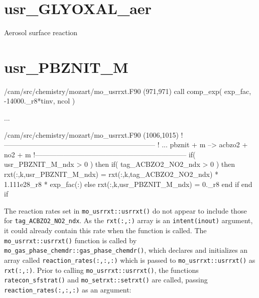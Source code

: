 \documentclass[titlepage]{article}
\begin{document}

\section{usr\_GLYOXAL\_aer}

Aerosol surface reaction


\section{usr\_PBZNIT\_M}

\begin{blockcode}[commandchars=\\\{\}]
\color{gray}/cam/src/chemistry/mozart/mo_usrrxt.F90 (971,971)
       call comp_exp( exp_fac, -14000._r8*tinv, ncol )

\color{gray}...

\color{gray}/cam/src/chemistry/mozart/mo_usrrxt.F90 (1006,1015)
!-----------------------------------------------------------------
!       ... pbznit + m --> acbzo2 + no2 + m
!-----------------------------------------------------------------
       if( usr_PBZNIT_M_ndx > 0 ) then
          if( tag_ACBZO2_NO2_ndx > 0 ) then
             rxt(:,k,usr_PBZNIT_M_ndx) = rxt(:,k,tag_ACBZO2_NO2_ndx) * 1.111e28_r8 * exp_fac(:)
          else
             rxt(:,k,usr_PBZNIT_M_ndx) = 0._r8
          end if
       end if
\end{blockcode}

The reaction rates set in \verb>mo_usrrxt::usrrxt()> do not appear to include those for \verb>tag_ACBZO2_NO2_ndx>. As the \verb>rxt(:,:)> array is an \verb>intent(inout)> argument, it could already contain this rate when the function is called. The \verb>mo_usrrxt::usrrxt()> function is called by \verb>mo_gas_phase_chemdr::gas_phase_chemdr()>, which declares and initializes an array called \verb>reaction_rates(:,:,:)> which is passed to \verb>mo_usrrxt::usrrxt()> as \verb>rxt(:,:)>. Prior to calling \verb>mo_usrrxt::usrrxt()>, the functions \verb>ratecon_sfstrat()> and \verb>mo_setrxt::setrxt()> are called, passing \verb>reaction_rates(:,:,:)> as an argument:
\end{document}
